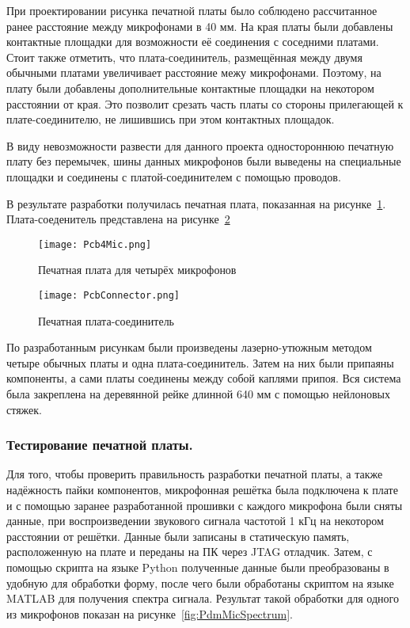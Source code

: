 При проектировании рисунка печатной платы было соблюдено рассчитанное ранее расстояние между микрофонами в 40 мм. На края платы были добавлены контактные площадки для возможности её соединения с соседними платами. Стоит также отметить, что плата-соединитель, размещённая между двумя обычными платами увеличивает расстояние межу микрофонами. Поэтому, на плату были добавлены дополнительные контактные площадки на некотором расстоянии от края. Это позволит срезать часть платы со стороны прилегающей к плате-соединителю, не лишившись при этом контактных площадок.

В виду невозможности развести для данного проекта одностороннюю печатную плату без перемычек, шины данных микрофонов были выведены на специальные площадки и соединены с платой-соединителем с помощью проводов.

В результате разработки получилась печатная плата, показанная на рисунке~\ref{fig:Pcb4Mic}. Плата-соеденитель представлена на рисунке~\ref{fig:PcbConnector}

\begin{figure}[ht]
	\centering
	\texttt{[image: Pcb4Mic.png]}  
	\caption{Печатная плата для четырёх микрофонов}
	\label{fig:Pcb4Mic}
\end{figure}

\begin{figure}[ht]
	\centering
	\texttt{[image: PcbConnector.png]}  
	\caption{Печатная плата-соединитель}
	\label{fig:PcbConnector}
\end{figure}

По разработанным рисункам были произведены лазерно-утюжным методом четыре обычных платы и одна плата-соединитель. Затем на них были припаяны компоненты, а сами платы соединены между собой каплями припоя. Вся система была закреплена на деревянной рейке длинной 640 мм с помощью нейлоновых стяжек.

\subsubsection{Тестирование печатной платы. }
Для того, чтобы проверить правильность разработки печатной платы, а также надёжность пайки компонентов, микрофонная решётка была подключена к плате \boardname{} и с помощью заранее разработанной прошивки с каждого микрофона были сняты данные, при воспроизведении звукового сигнала частотой 1 кГц на некотором расстоянии от решётки. Данные были записаны в статическую память, расположенную на плате и переданы на ПК через JTAG отладчик. Затем, с помощью скрипта на языке Python полученные данные были преобразованы в удобную для обработки форму, после чего были обработаны скриптом на языке MATLAB для получения спектра сигнала. Результат такой обработки для одного из микрофонов показан на рисунке~\ref{fig:PdmMicSpectrum}.

